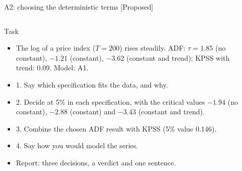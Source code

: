 \begin{frame}{A2: choosing the deterministic terms [Proposed]}
\propsub
\itemsize{\scriptsize}
\begin{columns}[T]
\begin{column}{\taskw}
\begin{block}{Task}
\begin{itemize}
    \item The log of a price index ($T = 200$) rises steadily. ADF: $\tau = 1.85$ (no constant), $-1.21$ (constant), $-3.62$ (constant and trend); KPSS with trend: 0.09. Model: A1.
    \item 1. Say which specification fits the data, and why.
    \item 2. Decide at 5\% in each specification, with the critical values $-1.94$ (no constant), $-2.88$ (constant) and $-3.43$ (constant and trend).
    \item 3. Combine the chosen ADF result with KPSS (5\% value 0.146).
    \item 4. Say how you would model the series.
    \item Report: three decisions, a verdict and one sentence.
\end{itemize}
\end{block}
\end{column}
\begin{column}{\solw}
\end{column}
\end{columns}
\end{frame}

